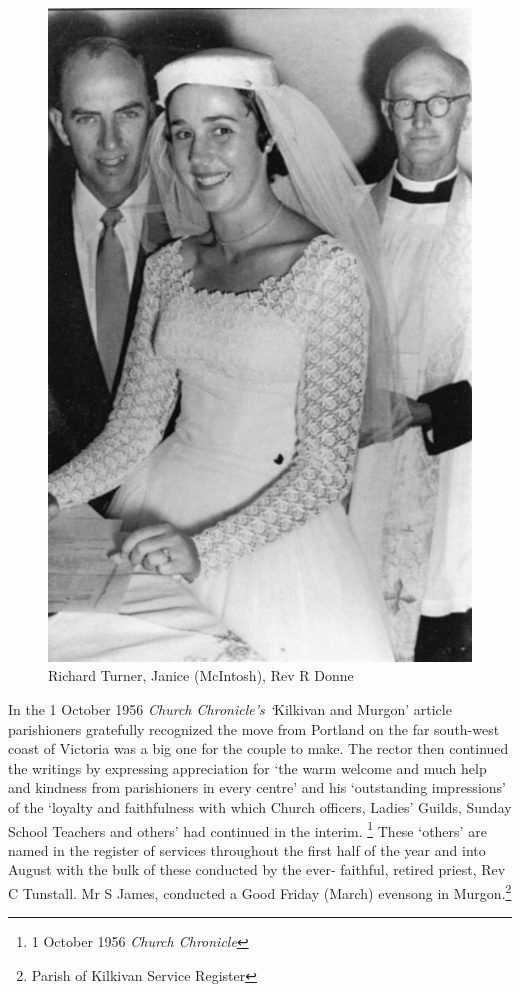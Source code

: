 \begin{figure}
\begin{center}
\includegraphics[width=1.\linewidth,center]{../images/Donne.jpg}
\caption{Richard Turner, Janice (McIntosh), Rev R Donne}
\end{center}
\end{figure}




In the 1 October 1956 \emph{Church Chronicle's `}Kilkivan and Murgon' article parishioners gratefully recognized the move from Portland on the far south-west coast of Victoria was a big one for the couple to make. The rector then continued the writings by expressing appreciation for `the warm welcome and much help and kindness from parishioners in every centre' and his `outstanding impressions' of the `loyalty and faithfulness with which Church officers, Ladies' Guilds, Sunday School Teachers and others' had continued in the interim. \footnote{1 October 1956 \emph{Church Chronicle}} These `others' are named in the register of services throughout the first half of the year and into August with the bulk of these conducted by the ever- faithful, retired priest, Rev C Tunstall. Mr S James, conducted a Good Friday (March) evensong in Murgon.\footnote{Parish of Kilkivan Service Register}


